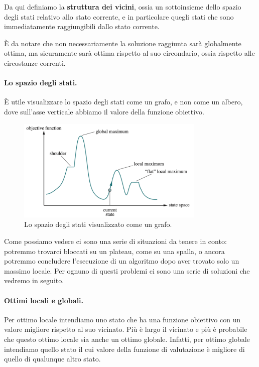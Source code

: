         Da qui definiamo la \textbf{struttura dei vicini}, ossia un sottoinsieme dello spazio degli stati relativo allo stato corrente, e in particolare quegli stati che sono immediatamente raggiungibili dallo stato corrente.
        
        È da notare che non necessariamente la soluzione raggiunta sarà globalmente ottima, ma sicuramente sarà ottima rispetto al suo circondario, ossia rispetto alle circostanze correnti.
        
    \paragraph{Lo spazio degli stati.} È utile visualizzare lo spazio degli stati come un grafo, e non come un albero, dove  sull'asse verticale abbiamo il valore della funzione obiettivo.
    
    \begin{figure}[h]
        \centering
        \includegraphics[width=0.8\textwidth]{img/img2.png}
        \caption{Lo spazio degli stati visualizzato come un grafo.}
        \label{fig:img2}
    \end{figure}
    
    Come possiamo vedere ci sono una serie di situazioni da tenere in conto: potremmo trovarci bloccati su un plateau, come su una spalla, o ancora potremmo concludere l'esecuzione di un algoritmo dopo aver trovato solo un massimo locale. Per ognuno di questi problemi ci sono una serie di soluzioni che vedremo in seguito. 
    
    \paragraph{Ottimi locali e globali.} Per ottimo locale intendiamo uno stato che ha una funzione obiettivo con un valore migliore rispetto al suo vicinato. Più è largo il vicinato e più è probabile che questo ottimo locale sia anche un ottimo globale. Infatti, per ottimo globale intendiamo quello stato il cui valore della funzione di valutazione è migliore di quello di qualunque altro stato. 
    
